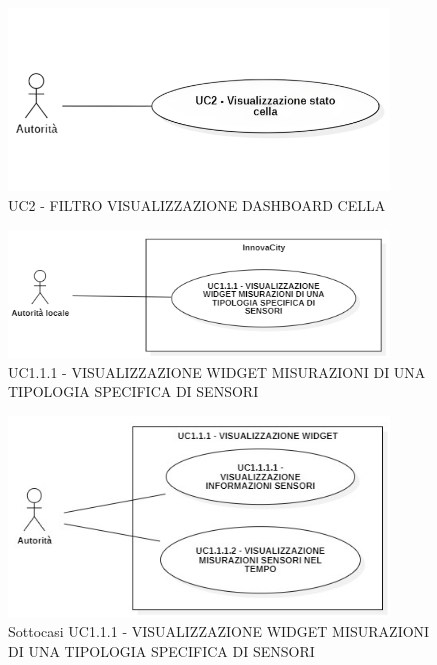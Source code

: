 

\begin{figure}[H]
    \centering
    \includegraphics[width=0.9\textwidth]{../Images/uc2.png}
    \caption{UC2 - FILTRO VISUALIZZAZIONE DASHBOARD CELLA}
    \label{fig:UC2}
\end{figure}


\begin{figure}[H]
    \centering
    \includegraphics[width=0.9\textwidth]{../Images/uc1.1.1.png}
    \caption{UC1.1.1 - VISUALIZZAZIONE WIDGET MISURAZIONI DI UNA TIPOLOGIA SPECIFICA DI SENSORI}
    \label{fig:UC3}
\end{figure}


\begin{figure}[H]
    \centering
    \includegraphics[width=0.9\textwidth]{../Images/subUC1.1.1.jpg}
    \caption{Sottocasi UC1.1.1 - VISUALIZZAZIONE WIDGET MISURAZIONI DI UNA TIPOLOGIA SPECIFICA DI SENSORI}
    \label{fig:UC3_sub}
\end{figure}

